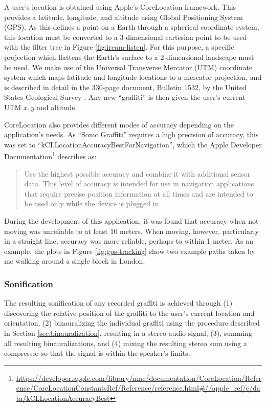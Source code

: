 A user's location is obtained using Apple's CoreLocation framework.  This provides a latitude, longitude, and altitude using Global Positioning System (GPS).  As this defines a point on a Earth through a spherical coordinate system, this location must be converted to a 3-dimensional cartesian point to be used with the filter tree in Figure \ref{fig:ircam-listen}.  For this purpose, a specific projection which flattens the Earth's surface to a 2-dimensional landscape must be used.  We make use of the Universal Transverse Mercator (UTM) coordinate system which maps latitude and longitude locations to a mercator projection, and is described in detail in the 330-page document, Bulletin 1532, by the United States Geological Survey \cite{}.  Any new ``graffiti'' is then given the user's current UTM $x,y$ and altitude.  

CoreLocation also provides different modes of accuracy depending on the application's needs.  As ``Sonic Graffiti'' requires a high precision of accuracy, this was set to ``kCLLocationAccuracyBestForNavigation'', which the Apple Developer Documentation\footnote{\url{https://developer.apple.com/library/mac/documentation/CoreLocation/Reference/CoreLocationConstantsRef/Reference/reference.html#//apple\_ref/c/data/kCLLocationAccuracyBest}} describes as:

\begin{quotation}
Use the highest possible accuracy and combine it with additional sensor data. This level of accuracy is intended for use in navigation applications that require precise position information at all times and are intended to be used only while the device is plugged in.
\end{quotation}

During the development of this application, it was found that accuracy when not moving was unreliable to at least 10 meters.  When moving, however, particularly in a straight line, accuracy was more reliable, perhaps to within 1 meter.  As an example, the plots in Figure \ref{fig:gps-tracking} show two example paths taken by me walking around a single block in London.  

\subsubsection{Sonification}

The resulting sonification of any recorded graffiti is achieved through (1) discovering the relative position of the graffiti to the user's current location and orientation, (2) binauralizing the individual graffiti using the procedure described in Section \ref{sec:binauralization}, resulting in a stereo audio signal, (3), summing all resulting binauralizations, and (4) mixing the resulting stereo sum using a compressor so that the signal is within the speaker's limits.   

